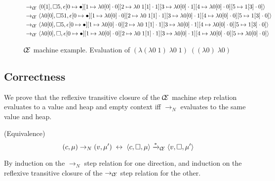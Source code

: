 \begin{figure}
\begin{align*}
&\rightarrow_{\mathcal{\mathcal{C} \mskip -4mu \mathcal{E}}}\langle 0[1],\square 5,\epsilon[0\mapsto\bullet][1\mapsto\lambda0[0]\cdot0][2\mapsto\lambda0\;1[1]\cdot1][3\mapsto\lambda0[0]\cdot1][4\mapsto\lambda0[0]\cdot0][5\mapsto1[3]\cdot0]\rangle\\ 
&\rightarrow_{\mathcal{\mathcal{C} \mskip -4mu \mathcal{E}}}\langle \lambda0[0],\square 5 1,\epsilon[0\mapsto\bullet][1\mapsto\lambda0[0]\cdot0][2\mapsto\lambda0\;1[1]\cdot1][3\mapsto\lambda0[0]\cdot1][4\mapsto\lambda0[0]\cdot0][5\mapsto1[3]\cdot0]\rangle\\ 
&\rightarrow_{\mathcal{\mathcal{C} \mskip -4mu \mathcal{E}}}\langle \lambda0[0],\square 5,\epsilon[0\mapsto\bullet][1\mapsto\lambda0[0]\cdot0][2\mapsto\lambda0\;1[1]\cdot1][3\mapsto\lambda0[0]\cdot1][4\mapsto\lambda0[0]\cdot0][5\mapsto1[3]\cdot0]\rangle\\ 
&\rightarrow_{\mathcal{\mathcal{C} \mskip -4mu \mathcal{E}}}\langle \lambda0[0],\square,\epsilon[0\mapsto\bullet][1\mapsto\lambda0[0]\cdot0][2\mapsto\lambda0\;1[1]\cdot1][3\mapsto\lambda0[0]\cdot1][4\mapsto\lambda0[0]\cdot0][5\mapsto\lambda0[0]\cdot0]\rangle
\end{align*}
\caption{$\mathcal{\mathcal{C} \mskip -4mu \mathcal{E}}$ machine example.
Evaluation of $(\lambda(\lambda0\;1)\;\lambda0\;1)\;((\lambda0)\;\lambda0)$}
\label{fig:state}
\end{figure}

\subsection{Correctness}
We prove that the reflexive transitive closure of the $\mathcal{\mathcal{C} \mskip -4mu \mathcal{E}}$ machine
step relation evaluates to a value and heap and empty context iff
$\xrightarrow{}_{N}$ evaluates to the same value and heap.

{\thm \textnormal{(Equivalence)} $$(c, \mu) \rightarrow_{N} (v, \mu') \;
\leftrightarrow \; \langle c, \square, \mu \rangle \xrightarrow{*
}_{\mathcal{\mathcal{C} \mskip -4mu \mathcal{E}}} \langle v, \square, \mu' \rangle $$} 

By induction on the $\rightarrow_{N}$ step relation for one direction, and
induction on the reflexive transitive closure of the
$\rightarrow_{\mathcal{\mathcal{C} \mskip -4mu \mathcal{E}}}$ step relation for
the other.

